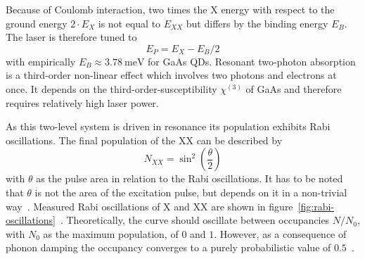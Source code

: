 Because of Coulomb interaction, two times the \ac{X} energy with respect to the ground energy $2 \cdot E_X$ is not equal to $E_{XX}$ but differs by the binding energy $E_B$.
The laser is therefore tuned to
\begin{equation}
\label{eq:e_p}
E_P = E_X - E_B / 2
\end{equation}
with empirically $E_B \approx \SI{3.78}{\milli \electronvolt}$ for GaAs \acp{QD}.
Resonant two-photon absorption is a third-order non-linear effect which involves two photons and electrons at once.
It depends on the third-order-susceptibility $\chi^{(3)}$ of GaAs and therefore requires relatively high laser power.

As this two-level system is driven in resonance its population exhibits Rabi oscillations.
The final population of the \ac{XX} can be described by
\begin{equation}
\label{eq:n-xx}
N_{XX} = \sin^2\left(\frac{\theta}{2}\right)
\end{equation}
with $\theta$ as the pulse area in relation to the Rabi oscillations.
It has to be noted that $\theta$ is not the area of the excitation pulse, but depends on it in a non-trivial way~\cite{stufler_two-photon_2006}.
Measured Rabi oscillations of \ac{X} and \ac{XX} are shown in figure~\ref{fig:rabi-oscillations}~\cite{reindl_phonon-assisted_2017}.
Theoretically, the curve should oscillate between occupancies $N/N_0$, with $N_0$ as the maximum population, of $0$ and $1$.
However, as a consequence of phonon damping the occupancy converges to a purely probabilistic value of $0.5$~\cite{forstner_phonon-assisted_2003}.
